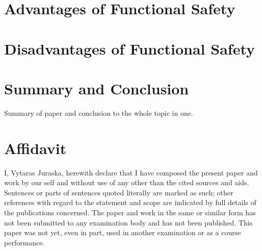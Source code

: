 \documentclass[conference]{IEEEtran}
\begin{document}
\section{Advantages of Functional Safety}

\section{Disadvantages of Functional Safety}

\section{Summary and Conclusion}

    Summary of paper and conclusion to the whole topic in one.

\section{Affidavit}
I, Vytaras Juraska, herewith declare that I have composed the present paper and work by our self and without use of any other than the cited sources and aids. Sentences or parts of sentences quoted literally are marked as such; other references with regard to the statement and scope are indicated by full details of the publications concerned. The paper and work in the same or similar form has not been submitted to any examination body and has not been published. This paper was not yet, even in part, used in another examination or as a course performance.


\end{document}

